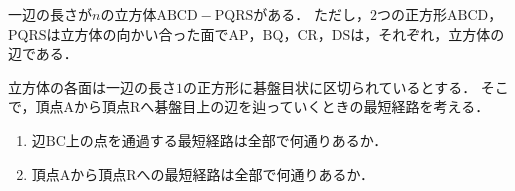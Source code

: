 \documentclass[../../main.tex]{subfiles}
\begin{document}
一辺の長さが$n$の立方体$\mathrm{ABCD-PQRS}$がある．
ただし，$2$つの正方形$\mathrm{ABCD}$，$\mathrm{PQRS}$は立方体の向かい合った面で$\mathrm{AP}$，$\mathrm{BQ}$，$\mathrm{CR}$，$\mathrm{DS}$は，それぞれ，立方体の辺である．

立方体の各面は一辺の長さ$1$の正方形に碁盤目状に区切られているとする．
そこで，頂点$\mathrm{A}$から頂点$\mathrm{R}$へ碁盤目上の辺を辿っていくときの最短経路を考える．

\begin{enumerate}
  \item 辺$\mathrm{BC}$上の点を通過する最短経路は全部で何通りあるか．
  \item 頂点$\mathrm{A}$から頂点$\mathrm{R}$への最短経路は全部で何通りあるか．
\end{enumerate}
\end{document}
